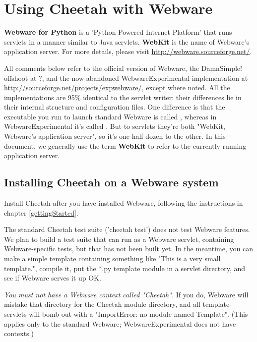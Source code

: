 \section{Using Cheetah with Webware}
\label{webware}

{\bf Webware for Python} is a 'Python-Powered Internet Platform' that runs
servlets in a manner similar to Java servlets.  {\bf WebKit} is the name of
Webware's application server.  For more details, please visit
\url{http://webware.sourceforge.net/}.

All comments below refer to the official version of Webware, the DamnSimple!
offshoot at ?, and the now-abandoned WebwareExperimental implementation at
\url{http://sourceforge.net/projects/expwebware/}, except where noted.  All the
implementations are 95\% identical to the servlet writer: their differences lie
in their internal structure and configuration files.  One difference is that
the executable you run to launch standard Webware is called ,
whereas in WebwareExperimental it's called . But to servlets
they're both "WebKit, Webware's application server", so it's one half dozen to
the other.  In this document, we generally use the term {\bf WebKit} to refer
to the currently-running application server.

\subsection{Installing Cheetah on a Webware system}
\label{webware.installing}

Install Cheetah after you have installed Webware, following the instructions in
chapter \ref{gettingStarted}.

The standard Cheetah test suite ('cheetah test') does not test Webware features.
We plan to build a test suite that can run as a Webware servlet, containing
Webware-specific tests, but that has not been built yet.  In the meantime, you
can make a simple template containing something like "This is a very small
template.", compile it, put the *.py template module in a servlet
directory, and see if Webware serves it up OK.  

{\em You must not have a Webware context called "Cheetah".}  If you do, Webware
will mistake that directory for the Cheetah module directory, and all 
template-servlets will bomb out with a "ImportError: no module named Template".
(This applies only to the standard Webware; WebwareExperimental does not have
contexts.)

